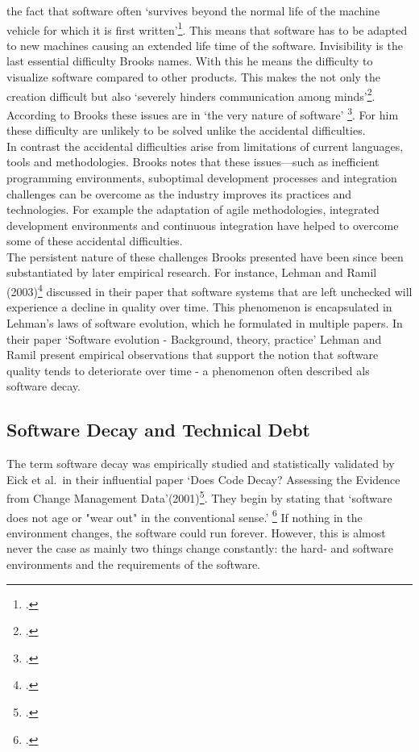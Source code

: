 the fact that software often `survives beyond the normal life of the machine vehicle for which it is first written'\footcite[4]{brooksNoSilverBullet1987}. This means that software has to be adapted to new machines causing an extended life time of the software.
Invisibility is the last essential difficulty Brooks names. With this he means the difficulty to visualize software compared to other products. This makes the not only the creation difficult but also `severely hinders communication among minds'\footcite[4]{brooksNoSilverBullet1987}.
According to Brooks these issues are in `the very nature of software' \footcite[2]{brooksNoSilverBullet1987}. For him these difficulty are unlikely to be solved unlike the accidental difficulties.\\

In contrast the accidental difficulties arise from limitations of current languages, tools and methodologies. Brooks notes that these issues—such as inefficient programming environments, suboptimal development processes and integration challenges can be overcome as the industry improves its practices and technologies.
For example the adaptation of agile methodologies, integrated development environments and continuous integration have helped to overcome some of these accidental difficulties.\\

The persistent nature of these challenges Brooks presented have been since been substantiated by later empirical research. For instance, Lehman and Ramil (2003)\footcite{lehmanSoftwareEvolutionBackground2003} discussed in their paper that software systems that are left unchecked will experience a decline in quality over time.
This phenomenon is encapsulated in Lehman's laws of software evolution, which he formulated in multiple papers. In their paper `Software evolution - Background, theory, practice' Lehman and Ramil present empirical observations that support the notion that software quality tends to deteriorate over time - a phenomenon often described als
software decay. 

\subsection{Software Decay and Technical Debt}
The term software decay was empirically studied and statistically validated by Eick et al.\ in their influential paper `Does Code Decay? Assessing the Evidence from Change Management Data'(2001)\footcite{eickDoesCodeDecay2001}. They begin by stating that `software does not age or "wear out" in the conventional sense.' \footcite[1]{eickDoesCodeDecay2001}
If nothing in the environment changes, the software could run forever. However, this is almost never the case as mainly two things change constantly: the hard- and software environments and the requirements of the software.\\

